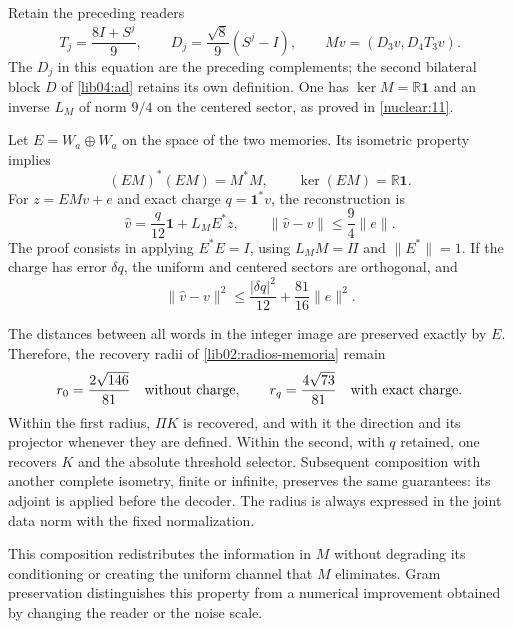 Retain the preceding readers
\begin{equation}
 T_j=\frac{8I+S^j}{9},\qquad
 D_j=\frac{\sqrt8}{9}(S^j-I),\qquad
 Mv=(D_3v,D_4T_3v).
 \label{lib04:m-antecedente}
\end{equation}
The \(D_j\) in this equation are the preceding complements;
the second bilateral block \(D\) of \eqref{lib04:ad} retains
its own definition. One has \(\ker M=\mathbb R\mathbf1\)
and an inverse \(L_M\) of norm \(9/4\) on the centered sector,
as proved in \cref{nuclear:11}.

Let \(E=W_a\oplus W_a\) on the space of the two memories.
Its isometric property implies
\begin{equation}
 (EM)^*(EM)=M^*M,\qquad
 \ker(EM)=\mathbb R\mathbf1.
 \label{lib04:gram-m-preservado}
\end{equation}
For \(z=EMv+e\) and exact charge
\(q=\mathbf1^*v\), the reconstruction is
\begin{equation}
 \widehat v=\frac q{12}\mathbf1+L_ME^*z,\qquad
 \|\widehat v-v\|\leq\frac94\|e\|.
 \label{lib04:inversa-m}
\end{equation}
The proof consists in applying \(E^*E=I\), using
\(L_MM=\Pi\) and \(\|E^*\|=1\). If the charge has error
\(\delta q\), the uniform and centered sectors are orthogonal, and
\begin{equation}
 \|\widehat v-v\|^2
 \leq\frac{|\delta q|^2}{12}+\frac{81}{16}\|e\|^2.
 \label{lib04:error-carga}
\end{equation}

The distances between all words in the integer image are preserved
exactly by \(E\). Therefore, the recovery radii of
\cref{lib02:radios-memoria} remain
\begin{equation}
 r_0=\frac{2\sqrt{146}}{81}\quad\hbox{without charge},\qquad
 r_q=\frac{4\sqrt{73}}{81}\quad\hbox{with exact charge}.
 \label{lib04:radios}
\end{equation}
Within the first radius, \(\Pi K\) is recovered, and with it the
direction and its projector whenever they are defined. Within the second,
with \(q\) retained, one recovers \(K\) and the absolute threshold
selector. Subsequent composition with another complete isometry, finite
or infinite, preserves the same guarantees: its adjoint is applied before
the decoder. The radius is always expressed in the joint data
norm with the fixed normalization.

This composition redistributes the information in \(M\) without degrading
its conditioning or creating the uniform channel that \(M\) eliminates.
Gram preservation distinguishes this property from a numerical
improvement obtained by changing the reader or the noise scale.


